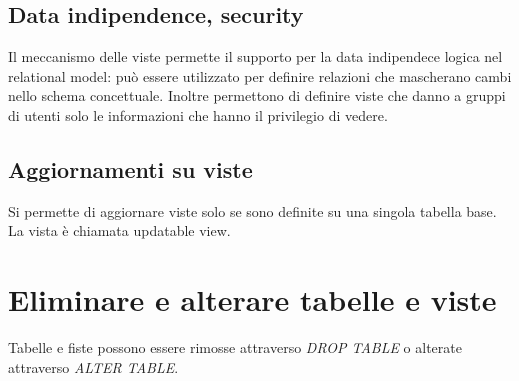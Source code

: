 \subsection{Data indipendence, security}
Il meccanismo delle viste permette il supporto per la data indipendece logica nel relational model: pu\`o essere utilizzato per definire relazioni che mascherano cambi nello schema concettuale. Inoltre 
permettono di definire viste che danno a gruppi di utenti solo le informazioni che hanno il privilegio di vedere. 
\subsection{Aggiornamenti su viste}
Si permette di aggiornare viste solo se sono definite su una singola tabella base. La vista \`e chiamata updatable view. 
\section{Eliminare e alterare tabelle e viste}
Tabelle e fiste possono essere rimosse attraverso \emph{DROP TABLE} o alterate attraverso \emph{ALTER TABLE}.
